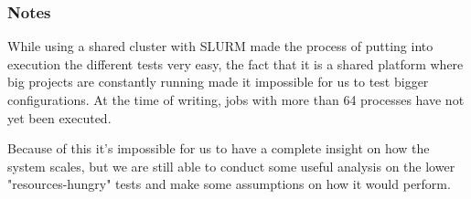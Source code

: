 \subsubsection{Notes}
While using a shared cluster with SLURM made the process of putting into execution the different tests very easy, the fact that it is a shared platform where big projects are constantly running made it impossible for us to test bigger configurations. At the time of writing, jobs with more than 64 processes have not yet been executed.\

Because of this it's impossible for us to have a complete insight on how the system scales, but we are still able to conduct some useful analysis on the lower "resources-hungry" tests and make some assumptions on how it would perform.
